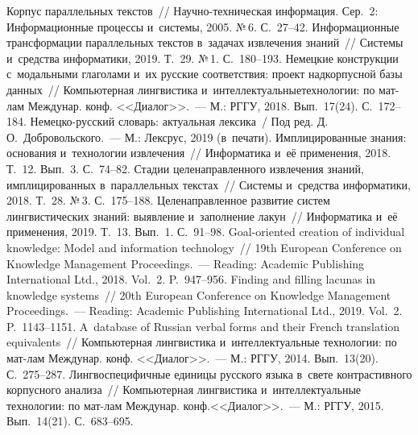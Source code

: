 \begin{multicols}{2}
{\small\frenchspacing
 {%
 \begin{thebibliography}{99}
 
 \vspace*{-3pt}
 
 Корпус параллельных текстов~// 
Научно-техническая информация. Сер.~2: Информационные процессы и~сис\-те\-мы, 2005. 
№\,6. С.~27--42.
 Информационные трансформации параллельных 
текстов в~задачах извлечения знаний~// Системы и~средства информатики, 2019. Т.~29. 
№\,1. С.~180--193.
 Немецкие конструкции с~модальными 
глаголами и~их русские соответствия: проект надкорпусной базы данных~// 
Компьютерная лингвистика и~интеллектуальные\linebreak \mbox{технологии}: по мат-лам 
Междунар. конф. 
<<Диалог>>.~--- М.: РГГУ, 2018. Вып.~17(24). С.~172--184.
Немецко-русский словарь: актуальная лексика~/ Под ред. Д.\,О.~Добровольского.~--- М.: 
Лексрус, 2019 (в~печати).
 Имплицированные знания: основания и~технологии извлечения~// 
Информатика и~её применения, 2018. Т.~12. Вып.~3. С.~74--82.
 Стадии целенаправленного извлечения знаний, имплицированных 
в~параллельных текстах~// Системы и~средства информатики, 2018. Т.~28. №\,3.  
С.~175--188.
 Целенаправленное развитие систем лингвистических знаний: 
выявление и~заполнение лакун~// Информатика и~её применения, 2019. Т.~13. Вып.~1. 
С.~91--98.
 Goal-oriented creation of individual knowledge: Model and information 
technology~// 19th European Conference on Knowledge Management Proceedings.~---  
Reading: Academic Publishing International Ltd., 2018. Vol.~2. P.~947--956.
 Finding and filling lacunas in knowledge systems~// 20th European Conference 
on Knowledge Management Proceedings.~---  Reading: Academic Publishing International Ltd., 
2019. Vol.~2. P.~1143--1151.
 A~database of Russian verbal forms and their French translation 
equivalents~// Компьютерная лингвистика и~интеллектуальные технологии: по мат-лам 
Междунар. конф. <<Диалог>>.~--- М.: РГГУ, 2014. Вып.~13(20). С.~275--287.
 Лингвоспецифичные единицы русского языка в~свете 
контрастивного корпусного анализа~// Компьютерная лингвистика и~интеллектуальные 
технологии: по мат-лам Междунар. конф.\linebreak <<Диалог>>.~--- М.: РГГУ, 2015. Вып.~14(21). 
С.~683--695.


\end{thebibliography}}}
\end{multicols}
